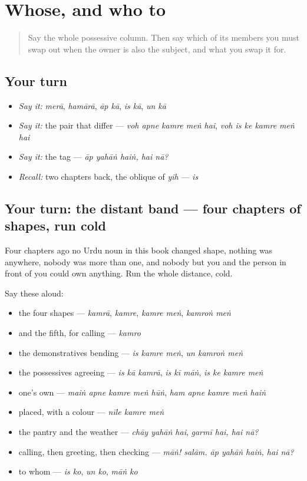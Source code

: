 \section[\texorpdfstring{\ur{اس} \ur{کا} · \ur{اپنا} … (is kā · apnā …)}{اس کا · اپنا … (is kā · apnā …)}]{Whose, and who to}

\label{lesson:UR-R26-whose-and-who-to}



\begin{quote}
Say the whole possessive column. Then say which of its members you must swap out when the owner is also the subject, and what you swap it for.
\end{quote}

\subsection*{Your turn}
\begin{itemize}
\raggedright
  \item \emph{Say it:} \emph{merā}, \emph{hamārā}, \emph{āp kā}, \emph{is kā}, \emph{un kā}
  \item \emph{Say it:} the pair that differ — \emph{voh apne kamre meṅ hai}, \emph{voh is ke kamre meṅ hai}
  \item \emph{Say it:} the tag — \emph{āp yahāṅ haiṅ, hai nā?}
  \item \emph{Recall:} two chapters back, the oblique of \emph{yih} — \emph{is}
\end{itemize}

\subsection*{Your turn: the distant band — four chapters of shapes, run cold}
Four chapters ago no Urdu noun in this book changed shape, nothing was anywhere, nobody was more than one, and nobody but you and the person in front of you could own anything. Run the whole distance, cold.

Say these aloud:

\begin{itemize}
\raggedright
  \item the four shapes — \emph{kamrā}, \emph{kamre}, \emph{kamre meṅ}, \emph{kamroṅ meṅ}
  \item and the fifth, for calling — \emph{kamro}
  \item the demonstratives bending — \emph{is kamre meṅ}, \emph{un kamroṅ meṅ}
  \item the possessives agreeing — \emph{is kā kamrā}, \emph{is kī māṅ}, \emph{is ke kamre meṅ}
  \item one's own — \emph{maiṅ apne kamre meṅ hūṅ}, \emph{ham apne kamre meṅ haiṅ}
  \item placed, with a colour — \emph{nīle kamre meṅ}
  \item the pantry and the weather — \emph{chāy yahāṅ hai}, \emph{garmī hai, hai nā?}
  \item calling, then greeting, then checking — \emph{māṅ! salām. āp yahāṅ haiṅ, hai nā?}
  \item to whom — \emph{is ko}, \emph{un ko}, \emph{māṅ ko}
\end{itemize}

